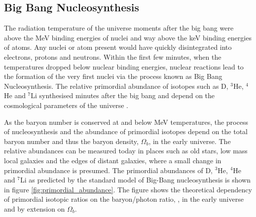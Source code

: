 \subsection{Big Bang Nucleosynthesis}
\label{subsec:BBN}

The radiation temperature of the universe moments after the big bang were above the MeV binding energies of nuclei and way above the keV binding energies of atoms. Any nuclei or atom present would have quickly disintegrated into electrons, protons and neutrons. Within the first few minutes, when the temperatures dropped below nuclear binding energies, nuclear reactions lead to the formation of the very first nuclei via the process known as Big Bang Nucleosynthesis. The relative primordial abundance of isotopes such as D, $^{3}$He, $^{4}$He and $^{7}$Li synthesised minutes after the big bang and depend on the cosmological parameters of the universe \cite{pns}. 

As the baryon number is conserved at and below MeV temperatures, the process of nucleosynthesis and the abundance of primordial isotopes depend on the total baryon number and thus the baryon density, $\Omega_{b}$, in the early universe. The relative abundances can be measured today in places such as old stars, low mass local galaxies and the edges of distant galaxies, where a small change in primordial abundance is presumed. The primordial abundances of D, $^{3}$He, $^{4}$He and $^{7}$Li as predicted by the standard model of Big-Bang nucleosynthesis is shown in figure \ref{fig:primordial_abundance}. The figure shows the theoretical dependency of primordial isotopic ratios on the baryon/photon ratio, \eta, in the early universe and by extension on $\Omega_{b}$.


